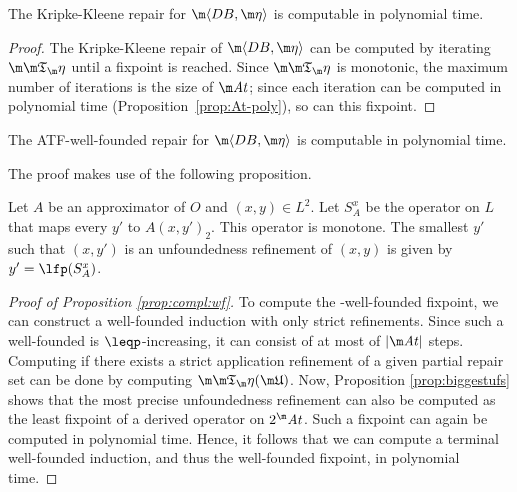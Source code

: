 \begin{proposition}
  The Kripke-Kleene repair for $\fulldb$ is computable in polynomial time.
  \label{prop:KK-poly}
\end{proposition}
\begin{proof}
  The Kripke-Kleene repair of $\fulldb$ can be computed by iterating $\Ap$ until a fixpoint is reached.
  Since $\Ap$ is monotonic, the maximum number of iterations is the size of $\atoms$; since each iteration can be computed in polynomial time (Proposition~\ref{prop:At-poly}), so can this fixpoint.
\end{proof}

\begin{proposition}\label{prop:compl:wf}
  The ATF-well-founded repair for $\fulldb$ is computable in polynomial time.
\end{proposition}

The proof makes use of the following proposition. 
\begin{proposition}\label{prop:biggestufs}
Let $A$ be an approximator of $O$ and $(x,y)\in L^2$. 
Let $S_A^x$ be the operator on $L$ that maps every $y'$ to $A(x,y')_2$.
This operator is monotone. 
The smallest $y'$ such that $(x,y')$ is an unfoundedness refinement of $(x,y)$ is given by 
$y'=\lfp (S_A^x)$.
 \end{proposition}
 \begin{proof}[Proof of Proposition \ref{prop:compl:wf}]
 To compute the \Ap-well-founded fixpoint, we can construct a well-founded induction with only strict refinements. 
 Since such a well-founded is $\leqp$-increasing, it can consist of at most of $|\atoms|$ steps. 
 Computing if there exists a strict application refinement of a given partial repair set \UUU
can be done by computing $\Ap(\UUU)$. Now, Proposition \ref{prop:biggestufs} shows that the most precise unfoundedness refinement can also be computed as the least fixpoint of a derived operator on $2^\atoms$. Such a fixpoint can again be computed in polynomial time. Hence, it follows that we can compute a terminal well-founded induction, and thus the well-founded fixpoint, in polynomial time. 
%  
\end{proof}

